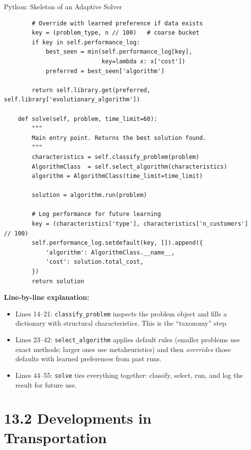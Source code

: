 \documentclass[aspectratio=169,10pt]{beamer}
\begin{document}
\begin{frame}[fragile]{Python: Skeleton of an Adaptive Solver}
\begin{lstlisting}
        # Override with learned preference if data exists
        key = (problem_type, n // 100)   # coarse bucket
        if key in self.performance_log:
            best_seen = min(self.performance_log[key],
                            key=lambda x: x['cost'])
            preferred = best_seen['algorithm']

        return self.library.get(preferred, self.library['evolutionary_algorithm'])

    def solve(self, problem, time_limit=60):
        """
        Main entry point. Returns the best solution found.
        """
        characteristics = self.classify_problem(problem)
        AlgorithmClass  = self.select_algorithm(characteristics)
        algorithm = AlgorithmClass(time_limit=time_limit)

        solution = algorithm.run(problem)

        # Log performance for future learning
        key = (characteristics['type'], characteristics['n_customers'] // 100)
        self.performance_log.setdefault(key, []).append({
            'algorithm': AlgorithmClass.__name__,
            'cost': solution.total_cost,
        })
        return solution
  \end{lstlisting}

  \smallskip
  \textbf{Line-by-line explanation:}
  \begin{itemize}
    \item Lines 14--21: \texttt{classify\_problem} inspects the
          problem object and fills a dictionary with structural
          characteristics.  This is the ``taxonomy'' step.
    \item Lines 23--42: \texttt{select\_algorithm} applies
          default rules (smaller problems use exact methods;
          larger ones use metaheuristics) and then \emph{overrides}
          those defaults with learned preferences from past runs.
    \item Lines 44--55: \texttt{solve} ties everything together:
          classify, select, run, and log the result for future use.
  \end{itemize}

\end{frame}

\section{13.2 Developments in Transportation}
\end{document}
